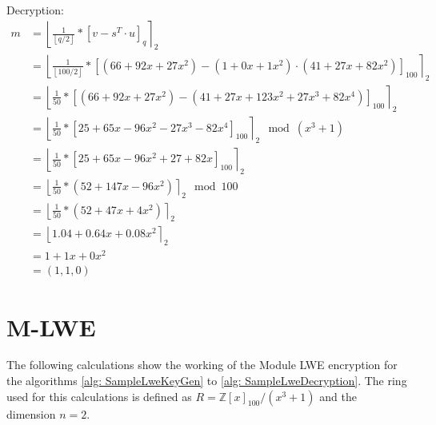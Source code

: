 Decryption:
\begin{align*}
  m & = \left\lfloor \frac{1}{\left\lfloor q/2\right\rfloor}*\left[v-s^T \cdot u\right]_q \right\rceil _2                                               \\
    & = \left\lfloor \frac{1}{\left\lfloor 100/2\right\rfloor}*\left[(66 + 92x + 27x^2 )- (1 + 0x + 1x^2) \cdot (41+27x+82x^2)\right]_{100}\right\rceil _2 \\
    & = \left\lfloor \frac{1}{50}*\left[(66 + 92x + 27x^2 )- (41 + 27x + 123x^2 + 27x^3 + 82x^4)\right]_{100}\right\rceil _2                               \\
    & = \left\lfloor \frac{1}{50}*\left[25 + 65x - 96x^2 - 27x^3 - 82x^4\right]_{100}\right\rceil _2 \mod (x^3+1)                                          \\
    & = \left\lfloor \frac{1}{50}*\left[25 + 65x - 96x^2 + 27 + 82x\right]_{100}\right\rceil _2                                                            \\
    & = \left\lfloor \frac{1}{50}*(52+147x-96x^2)\right\rceil _2 \mod 100                                                                 \\
    & = \left\lfloor \frac{1}{50}*(52+47x+4x^2)\right\rceil _2                                                                            \\
    & = \left\lfloor 1.04 + 0.64x + 0.08x^2\right\rceil _2                                                                                \\
    & = 1 + 1x + 0x^2                                                                                                                     \\
    & = (1, 1, 0)
\end{align*}

\section{M-LWE}
\label{app:MlweExampleCalc}
The following calculations show the working of the Module LWE encryption for the algorithms \ref{alg: SampleLweKeyGen} to \ref{alg: SampleLweDecryption}. The ring used for this calculations is defined as $R=\mathbb{Z}[x]_{100}/(x^3+1)$ and the dimension $n=2$.

